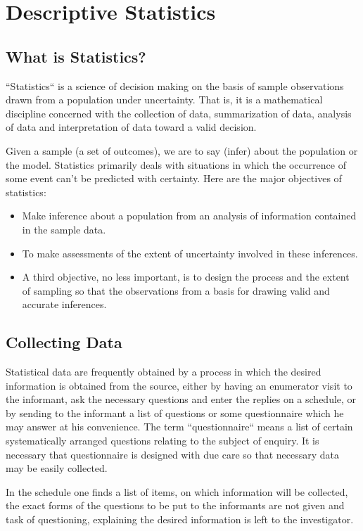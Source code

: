 \chapter{Descriptive Statistics}

\section{What is Statistics?}

``Statistics`` is a science of decision making on the basis of sample observations 
drawn from a population under uncertainty. That is, it is a mathematical discipline 
concerned with the collection of data, summarization of data, analysis of data and
interpretation of data toward a valid decision.

Given a sample (a set of outcomes), we are to say (infer) about the population or 
the model. Statistics primarily deals with situations in which the occurrence of some event 
can't be predicted with certainty. Here are the major objectives of statistics:
\begin{itemize}
    \item Make inference about a population from an analysis of information 
contained in the sample data.
    \item To make assessments of the extent of uncertainty involved in these inferences.
    \item A third objective, no less important, is to design the process and the extent of sampling so 
that the observations from a basis for drawing valid and accurate inferences.  
\end{itemize}

\section{Collecting Data}

Statistical data are frequently obtained by a process in which the desired information is 
obtained from the source, either by having an enumerator visit to the informant, ask the 
necessary questions and enter the replies on a schedule, or by sending to the informant a 
list of questions or some questionnaire which he may answer at his 
convenience. The term ``questionnaire`` means a list of certain systematically arranged 
questions relating to the subject of enquiry. It is necessary that questionnaire is designed 
with due care so that necessary data may be easily collected. 

 In the schedule one finds a list of items, on which information will be collected, 
the exact forms of the questions to be put to the informants are not given and task of 
questioning, explaining the desired information is left to the investigator. 

